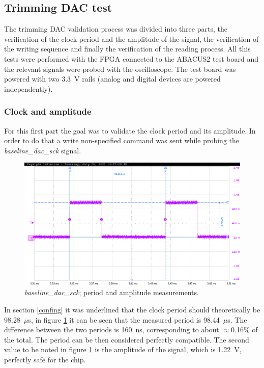 \subsection{Trimming DAC test}\label{dactests}
The trimming DAC validation process was divided into three parts, the verification of the clock period and the amplitude of the signal, the verification of the writing sequence and finally the verification of the reading process. 
All this tests were performed with the FPGA connected to the ABACUS2 test board and the relevant signals were probed with the oscilloscope. The test board was powered with two 3.3~V rails (analog and digital devices are powered independently).
\subsubsection{Clock and amplitude}
For this first part the goal was to validate the clock period and its amplitude. In order to do that a write non-specified command was sent while probing the \textit{baseline\_dac\_sck} signal. 
\begin{figure}[H]
	\centering
	\includegraphics[width=0.7\linewidth]{IMG/ch5/probe/09-08-2021_clock-specks}
	\caption{\textit{baseline\_dac\_sck}; period and amplitude measurements.}
	\label{fig:clockspecs}
\end{figure}
\noindent In section \ref{confing} it was underlined that the clock period should theoretically be 98.28~$\mu$s, in figure \ref{fig:clockspecs} it can be seen that the measured period is 98.44~$\mu$s. The difference between the two periods is 160~ns, corresponding to about $\approx$0.16\% of the total. The period can be then considered perfectly compatible.
The second value to be noted in figure \ref{fig:clockspecs} is the amplitude of the signal, which is 1.22~V, perfectly safe for the chip. 

